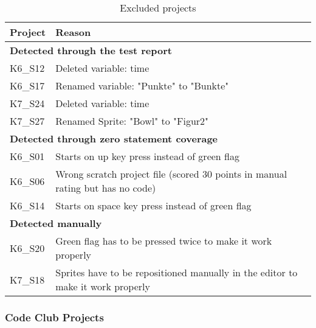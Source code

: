 \begin{table}
    \centering
    \scriptsize
    \begin{tabular}{ll}
        \toprule
        Project & Reason                                                                          \\
        \midrule
        \multicolumn{2}{l}{\textbf{Detected through the test report}}                             \\
        K6\_S12 & Deleted variable: time                                                          \\
        K6\_S17 & Renamed variable: "Punkte" to "Bunkte"                                          \\
        K7\_S24 & Deleted variable: time                                                          \\
        K7\_S27 & Renamed Sprite: "Bowl" to "Figur2"                                              \\[\medskipamount]

        \multicolumn{2}{l}{\textbf{Detected through zero statement coverage}}                     \\
        K6\_S01 & Starts on up key press instead of green flag                                    \\
        K6\_S06 & Wrong scratch project file (scored 30 points in manual rating but has no code)  \\
        K6\_S14 & Starts on space key press instead of green flag                                 \\[\medskipamount]

        \multicolumn{2}{l}{\textbf{Detected manually}}                                            \\
        K6\_S20 & Green flag has to be pressed twice to make it work properly                     \\
        K7\_S18 & Sprites have to be repositioned manually in the editor to make it work properly \\
        \bottomrule
    \end{tabular}
    \caption{Excluded projects}
    \label{tab:excluded_projects}
\end{table}

\subsubsection{Code Club Projects}

